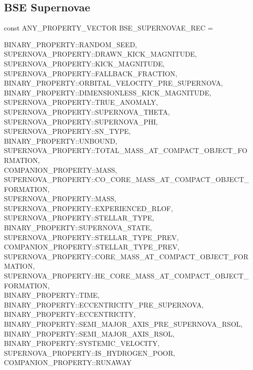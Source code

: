 \newpage
\subsection{BSE Supernovae}\label{sec:BSESupernovae}

const ANY\_PROPERTY\_VECTOR BSE\_SUPERNOVAE\_REC = \lcb

\hfill
\begin{minipage}{\dimexpr\textwidth-2em}
    BINARY\_PROPERTY::RANDOM\_SEED, \\
    SUPERNOVA\_PROPERTY::DRAWN\_KICK\_MAGNITUDE, \\
    SUPERNOVA\_PROPERTY::KICK\_MAGNITUDE, \\
    SUPERNOVA\_PROPERTY::FALLBACK\_FRACTION, \\
    BINARY\_PROPERTY::ORBITAL\_VELOCITY\_PRE\_SUPERNOVA, \\
    BINARY\_PROPERTY::DIMENSIONLESS\_KICK\_MAGNITUDE, \\ 
    SUPERNOVA\_PROPERTY::TRUE\_ANOMALY, \\			
    SUPERNOVA\_PROPERTY::SUPERNOVA\_THETA, \\
    SUPERNOVA\_PROPERTY::SUPERNOVA\_PHI, \\
    SUPERNOVA\_PROPERTY::SN\_TYPE, \\
    BINARY\_PROPERTY::UNBOUND, \\
    SUPERNOVA\_PROPERTY::TOTAL\_MASS\_AT\_COMPACT\_OBJECT\_FORMATION, \\
    COMPANION\_PROPERTY::MASS, \\
    SUPERNOVA\_PROPERTY::CO\_CORE\_MASS\_AT\_COMPACT\_OBJECT\_FORMATION, \\
    SUPERNOVA\_PROPERTY::MASS, \\
    SUPERNOVA\_PROPERTY::EXPERIENCED\_RLOF, \\
    SUPERNOVA\_PROPERTY::STELLAR\_TYPE, \\
    BINARY\_PROPERTY::SUPERNOVA\_STATE, \\
    SUPERNOVA\_PROPERTY::STELLAR\_TYPE\_PREV, \\
    COMPANION\_PROPERTY::STELLAR\_TYPE\_PREV, \\
    SUPERNOVA\_PROPERTY::CORE\_MASS\_AT\_COMPACT\_OBJECT\_FORMATION, \\
    SUPERNOVA\_PROPERTY::HE\_CORE\_MASS\_AT\_COMPACT\_OBJECT\_FORMATION, \\
    BINARY\_PROPERTY::TIME, \\
    BINARY\_PROPERTY::ECCENTRICITY\_PRE\_SUPERNOVA, \\  
    BINARY\_PROPERTY::ECCENTRICITY, \\
    BINARY\_PROPERTY::SEMI\_MAJOR\_AXIS\_PRE\_SUPERNOVA\_RSOL, \\
    BINARY\_PROPERTY::SEMI\_MAJOR\_AXIS\_RSOL, \\
    BINARY\_PROPERTY::SYSTEMIC\_VELOCITY, \\
    SUPERNOVA\_PROPERTY::IS\_HYDROGEN\_POOR, \\
    COMPANION\_PROPERTY::RUNAWAY
\end{minipage}
\par\rcb{;}

